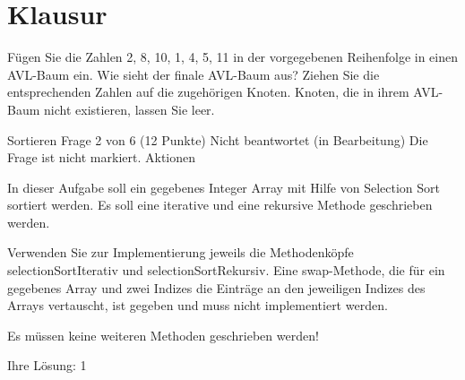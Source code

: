 \documentclass{lehramt-informatik}
\begin{document}

\chapter{Klausur}

Fügen Sie die Zahlen 2, 8, 10, 1, 4, 5, 11 in der vorgegebenen Reihenfolge in einen AVL-Baum ein. Wie sieht der finale AVL-Baum aus? Ziehen Sie die entsprechenden Zahlen auf die zugehörigen Knoten. Knoten, die in ihrem AVL-Baum nicht existieren, lassen Sie leer.

Sortieren
Frage 2 von 6 (12 Punkte)
Nicht beantwortet (in Bearbeitung)
Die Frage ist nicht markiert.  Aktionen

In dieser Aufgabe soll ein gegebenes Integer Array mit Hilfe von Selection Sort sortiert werden. Es soll eine iterative und eine rekursive Methode geschrieben werden.

Verwenden Sie zur Implementierung jeweils die Methodenköpfe selectionSortIterativ und selectionSortRekursiv. Eine swap-Methode, die für ein gegebenes Array und zwei Indizes die Einträge an den jeweiligen Indizes des Arrays vertauscht, ist gegeben und muss nicht implementiert werden.

Es müssen keine weiteren Methoden geschrieben werden!

Ihre Lösung:
1
\end{document}
